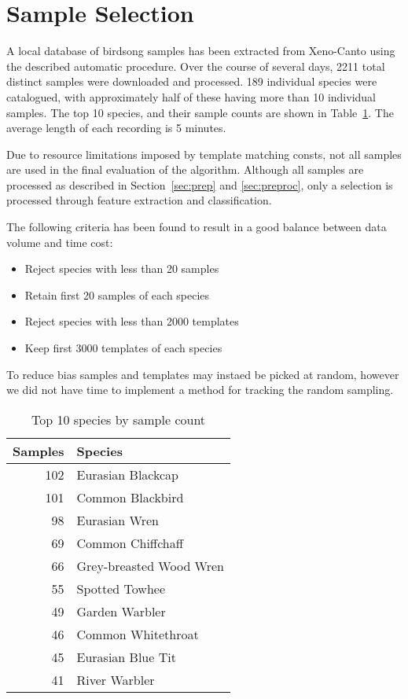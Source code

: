 \section{Sample Selection}\label{sec:sample_select}
A local database of birdsong samples has been extracted from Xeno-Canto using
the described automatic procedure.
Over the course of several days, 2211 total distinct samples were downloaded and
processed.
189 individual species were catalogued, with approximately half of these having
more than 10 individual samples.
The top 10 species, and their sample counts are shown in Table~\ref{tab:top10}.
The average length of each recording is 5 minutes.

Due to resource limitations imposed by template matching consts, not all samples
are used in the final evaluation of the algorithm.
Although all samples are processed as described in Section~\ref{sec:prep} and
\ref{sec:preproc}, only a selection is processed through feature extraction and
classification.

The following criteria has been found to result in a good balance between
data volume and time cost:
\begin{itemize}
  \item Reject species with less than 20 samples
  \item Retain first 20 samples of each species
  \item Reject species with less than 2000 templates
  \item Keep first 3000 templates of each species
\end{itemize}
To reduce bias samples and templates may instaed be picked at random, however
we did not have time to implement a method for tracking the random sampling.

\begin{table}[!htb]
  \caption{Top 10 species by sample count}\label{tab:top10}
  \centering
    \begin{tabular}{r l}
      Samples & Species \\ \hline
      102 & Eurasian Blackcap\\
      101 & Common Blackbird\\
      98  & Eurasian Wren\\
      69  & Common Chiffchaff\\
      66  & Grey-breasted Wood Wren\\
      55  & Spotted Towhee\\
      49  & Garden Warbler\\
      46  & Common Whitethroat\\
      45  & Eurasian Blue Tit\\
      41  & River Warbler\\
    \end{tabular}
\end{table}

